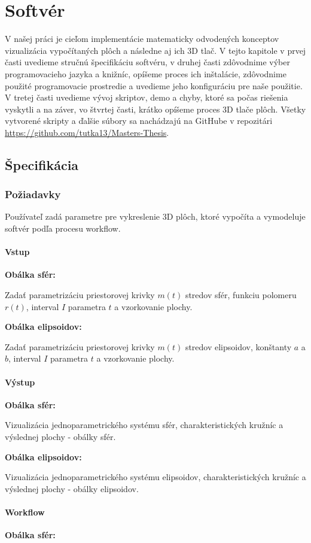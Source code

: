 \chapter{Softvér}
V našej práci je cieľom implementácie matematicky odvodených konceptov vizualizácia vypočítaných plôch a následne aj ich 3D tlač. V tejto kapitole v prvej časti uvedieme stručnú špecifikáciu softvéru, v druhej časti zdôvodnime výber programovacieho jazyka a knižníc, opíšeme proces ich inštalácie, zdôvodnime použité programovacie prostredie a uvedieme jeho konfiguráciu pre naše použitie. V tretej časti uvedieme vývoj skriptov, demo a chyby, ktoré sa počas riešenia vyskytli a na záver, vo štvrtej časti, krátko opíšeme proces 3D tlače plôch. Všetky vytvorené skripty a ďalšie súbory sa nachádzajú na GitHube v repozitári \url{https://github.com/tutka13/Masters-Thesis}.
\section{Špecifikácia}
\subsection{Požiadavky}
Používateľ zadá parametre pre vykreslenie 3D plôch, ktoré vypočíta a vymodeluje softvér podľa procesu workflow.
\subsubsection{Vstup}
\textbf{Obálka sfér:}

Zadať parametrizáciu priestorovej krivky $m(t)$ stredov sfér, funkciu polomeru $r(t)$, interval $I$ parametra $t$ a vzorkovanie plochy.

\noindent \textbf{Obálka elipsoidov:}

Zadať parametrizáciu priestorovej krivky $m(t)$ stredov elipsoidov, konštanty $a$ a $b$, interval $I$ parametra $t$ a vzorkovanie plochy.
\subsubsection{Výstup} 
\textbf{Obálka sfér:}

Vizualizácia jednoparametrického systému sfér, charakteristických kružníc a výslednej plochy - obálky sfér.

\noindent \textbf{Obálka elipsoidov:}

Vizualizácia jednoparametrického systému elipsoidov, charakteristických kružníc a výslednej plochy - obálky elipsoidov.
\subsubsection{Workflow}
\textbf{Obálka sfér:}

